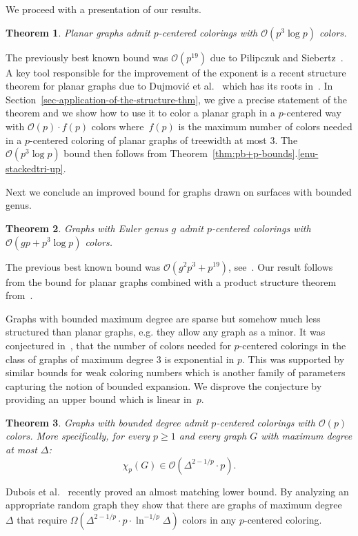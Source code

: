 \documentclass[11pt]{article}
\newtheorem{theorem}{Theorem}
\begin{document}
We proceed with a presentation of our results.

\begin{theorem}
Planar graphs admit $p$-centered colorings with $\mathcal{O}(p^3\log p)$ colors. 
\label{thm:planarup}
\end{theorem}
The previously best known bound was $\mathcal{O}(p^{19})$ due to
Pilipczuk and Siebertz~\cite{PS19}.
A key tool responsible for the improvement of the exponent is 
a recent structure theorem for planar graphs due to 
Dujmović et al.~\cite{DJMMUW-queues} which has its roots in~\cite{PS19}.
In Section~\ref{sec-application-of-the-structure-thm}, 
we give a precise statement of the theorem and we show how to use it to
color a planar graph in a $p$-centered way with $\mathcal{O}(p)\cdot f(p)$ colors 
where~$f(p)$ is the maximum number of colors needed in a $p$-centered coloring
of planar graphs of treewidth at most $3$.
The $\mathcal{O}(p^3\log p)$ bound then follows from
Theorem~\ref{thm:pb+p-bounds}.\ref{enu-stackedtri-up}.
  

Next we conclude an improved bound for graphs drawn on surfaces with bounded genus.
\begin{theorem}\label{thm:genusup}
  Graphs with Euler genus $g$ admit $p$-centered
  colorings with $\mathcal{O}(gp+p^3\log p)$ colors.
\end{theorem}
The previous best known bound was $\mathcal{O}(g^2p^3+p^{19})$, see~\cite{PS19}.
Our result follows from the bound for planar graphs combined with 
a product structure theorem from~\cite{DJMMUW-queues}.

Graphs with bounded maximum degree are sparse but somehow 
much less structured than planar graphs, e.g. 
they allow any graph as a minor.
It was conjectured in~\cite{PS19}, that the number of colors
needed for $p$-centered colorings in the class of graphs of maximum degree $3$ 
is exponential in $p$.
This was supported by similar bounds for weak coloring numbers 
which is another family of parameters capturing the notion 
of bounded expansion. We disprove the conjecture by providing an upper
bound which is linear in~$p$.
\begin{theorem}\label{thm:bounded-degree}
Graphs with bounded degree admit $p$-centered colorings with $\mathcal{O}(p)$ colors.
More specifically, for every $p\geq1$ 
and every graph $G$ with maximum degree at most $\Delta$:
\[
\chi_p(G)\in \mathcal{O}\left(\Delta^{2-1/p} \cdot p\right).
\]
\end{theorem}

Dubois et al.~\cite{DJPPP20} recently proved an
almost matching lower bound. By analyzing an appropriate random graph
they show that there are graphs of maximum degree $\Delta$ that
require $\Omega(\Delta^{2-1/p}\cdot p\cdot \ln^{-1/p}\Delta)$ colors in any
$p$-centered coloring.
\end{document}
